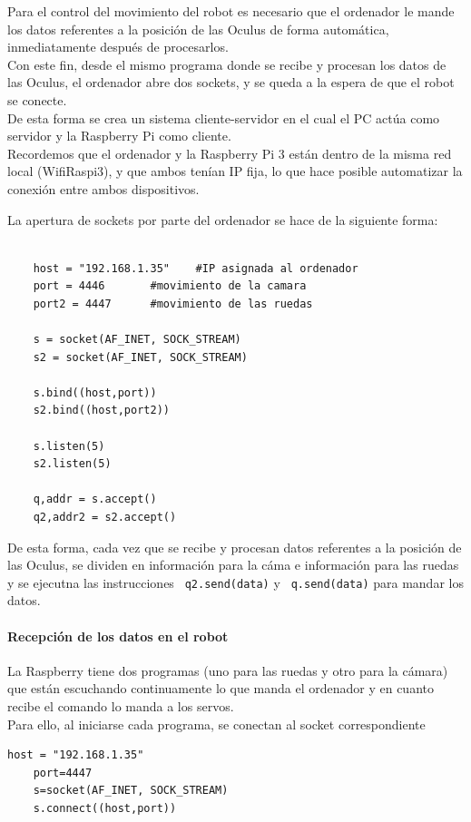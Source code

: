 \documentclass[twoside, 11pt]{epstfg}
\begin{document}
Para el control del movimiento del robot es necesario que el ordenador le mande los datos referentes a la posición de las Oculus de forma automática, inmediatamente después de procesarlos.\\
Con este fin, desde el mismo programa donde se recibe y procesan los datos de las Oculus, el ordenador abre dos sockets, y se queda a la espera de que el robot se conecte.\\De esta forma se crea un sistema cliente-servidor en el cual el PC actúa como servidor y la Raspberry Pi como cliente.\\
Recordemos que el ordenador y la Raspberry Pi 3 están dentro de la misma red local (WifiRaspi3), y que ambos tenían IP fija, lo que hace posible automatizar la conexión entre ambos dispositivos.

La apertura de sockets por parte del ordenador se hace de la siguiente forma:

\lstset{language=python, breaklines=true, basicstyle=\footnotesize}
\begin{lstlisting}[frame=single]

	host = "192.168.1.35"    #IP asignada al ordenador
	port = 4446       #movimiento de la camara
	port2 = 4447      #movimiento de las ruedas

	s = socket(AF_INET, SOCK_STREAM)
	s2 = socket(AF_INET, SOCK_STREAM)

	s.bind((host,port))
	s2.bind((host,port2))

	s.listen(5)
	s2.listen(5)

	q,addr = s.accept()
	q2,addr2 = s2.accept()

\end{lstlisting}

De esta forma, cada vez que se recibe y procesan datos referentes a la posición de las Oculus, se dividen en información para la cáma e información para las ruedas y se ejecutna las instrucciones \texttt{ q2.send(data)}  y \texttt{ q.send(data)} para mandar los datos.
\paragraph{Recepción de los datos en el robot}

La Raspberry tiene dos programas (uno para las ruedas y otro para la
cámara) que están escuchando continuamente lo que manda el ordenador y en
cuanto recibe el comando lo manda a los servos.\\
Para ello, al iniciarse cada programa, se conectan al socket correspondiente
\lstset{language=python, breaklines=true, basicstyle=\footnotesize}
\begin{lstlisting}[frame=single]
	host = "192.168.1.35"
	port=4447
	s=socket(AF_INET, SOCK_STREAM)
	s.connect((host,port))
\end{lstlisting}
\end{document}
